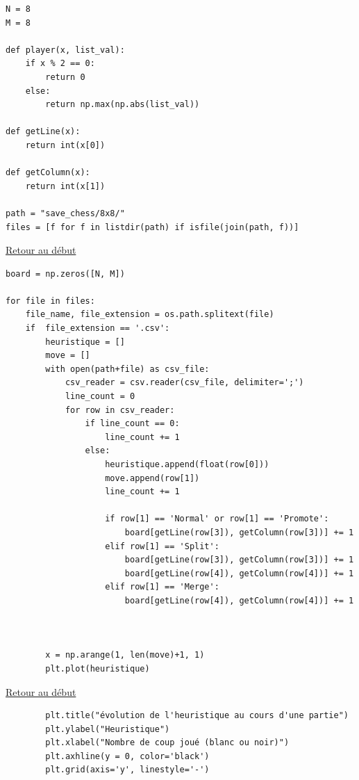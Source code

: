 {\begin{frame}[fragile]
\begin{verbatim}
N = 8
M = 8

def player(x, list_val):
    if x % 2 == 0:
        return 0
    else:
        return np.max(np.abs(list_val))   
    
def getLine(x):
    return int(x[0])

def getColumn(x):
    return int(x[1])

path = "save_chess/8x8/"
files = [f for f in listdir(path) if isfile(join(path, f))]

\end{verbatim}
\end{frame}

\begin{frame}[fragile]
\hyperlink{conclusion}{Retour au début}\newline
\begin{verbatim}
board = np.zeros([N, M])

for file in files:
    file_name, file_extension = os.path.splitext(file)
    if  file_extension == '.csv':
        heuristique = []
        move = []
        with open(path+file) as csv_file:
            csv_reader = csv.reader(csv_file, delimiter=';')
            line_count = 0
            for row in csv_reader:
                if line_count == 0:
                    line_count += 1
                else:
                    heuristique.append(float(row[0]))
                    move.append(row[1])
                    line_count += 1

                    if row[1] == 'Normal' or row[1] == 'Promote':
                        board[getLine(row[3]), getColumn(row[3])] += 1
                    elif row[1] == 'Split':
                        board[getLine(row[3]), getColumn(row[3])] += 1
                        board[getLine(row[4]), getColumn(row[4])] += 1
                    elif row[1] == 'Merge':
                        board[getLine(row[4]), getColumn(row[4])] += 1



        x = np.arange(1, len(move)+1, 1)
        plt.plot(heuristique)
\end{verbatim}
\end{frame}

\begin{frame}[fragile]
\hyperlink{conclusion}{Retour au début}\newline
\begin{verbatim}
        plt.title("évolution de l'heuristique au cours d'une partie")
        plt.ylabel("Heuristique")
        plt.xlabel("Nombre de coup joué (blanc ou noir)")
        plt.axhline(y = 0, color='black')
        plt.grid(axis='y', linestyle='-')


\end{verbatim}
\end{frame}}
